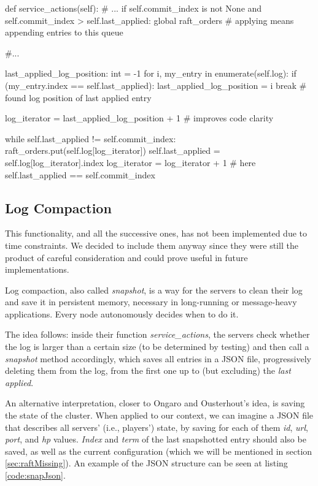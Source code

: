 \begin{python}[label={code:applyToState}, caption={All nodes apply entries to state based on \textit{commit\_index}}]
def service_actions(self):
        # ...
        if self.commit_index is not None and self.commit_index > self.last_applied:   
            global raft_orders  # applying means appending entries to this queue

            #...

            last_applied_log_position: int = -1 
            for i, my_entry in enumerate(self.log):
                if (my_entry.index == self.last_applied):
                    last_applied_log_position = i
                    break # found log position of last applied entry 
            
            log_iterator = last_applied_log_position + 1    # improves code clarity 

            while self.last_applied != self.commit_index:
                raft_orders.put(self.log[log_iterator])
                self.last_applied = self.log[log_iterator].index
                log_iterator = log_iterator + 1
            # here self.last_applied == self.commit_index
\end{python}

\subsection{Log Compaction}

This functionality, and all the successive ones, has not been implemented due to time constraints. We decided to include them anyway since they were still the product of careful consideration and could prove useful in future implementations.

Log compaction, also called \textit{snapshot}, is a way for the servers to clean their log and save it in persistent memory, necessary in long-running or message-heavy applications. Every node autonomously decides when to do it.

The idea follows: inside their function \textit{service\_actions}, the servers check whether the log is larger than a certain size (to be determined by testing) and then call a \textit{snapshot} method accordingly, which saves all entries in a JSON file, progressively deleting them from the log, from the first one up to (but excluding) the \textit{last applied}.

An alternative interpretation, closer to Ongaro and Ousterhout's idea, is saving the state of the cluster. When applied to our context, we can imagine a JSON file that describes all servers' (i.e., players') state, by saving for each of them \textit{id}, \textit{url}, \textit{port}, and \textit{hp} values. \textit{Index} and \textit{term} of the last snapshotted entry should also be saved, as well as the current configuration (which we will be mentioned in section \ref{sec:raftMissing}). An example of the JSON structure can be seen at listing \ref{code:snapJson}. 

